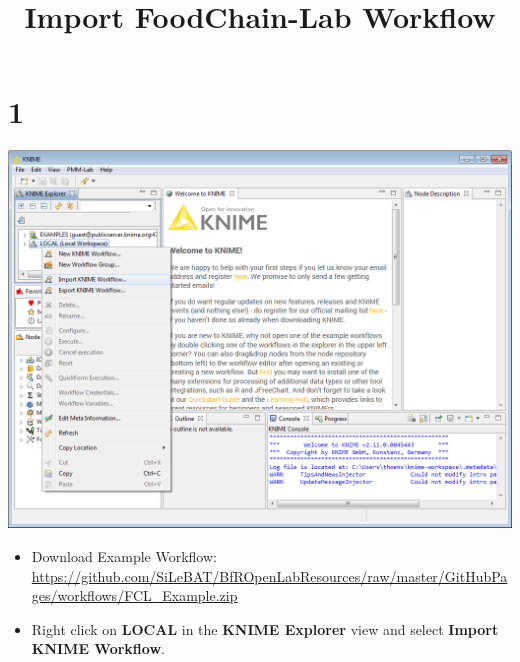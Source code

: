 \documentclass{beamer}
\title{Import FoodChain-Lab Workflow}
\date{}
\begin{document}
\maketitle
 
\section{1}
\begin{frame}
	\begin{center}
  		\includegraphics[height=0.6\textheight]{1.png}
	\end{center}
	\begin{itemize}
		\item Download Example Workflow: \url{https://github.com/SiLeBAT/BfROpenLabResources/raw/master/GitHubPages/workflows/FCL_Example.zip}
		\item Right click on \textbf{LOCAL} in the \textbf{KNIME Explorer} view and select \textbf{Import KNIME Workflow}.
	\end{itemize}
\end{frame}
\end{document}
